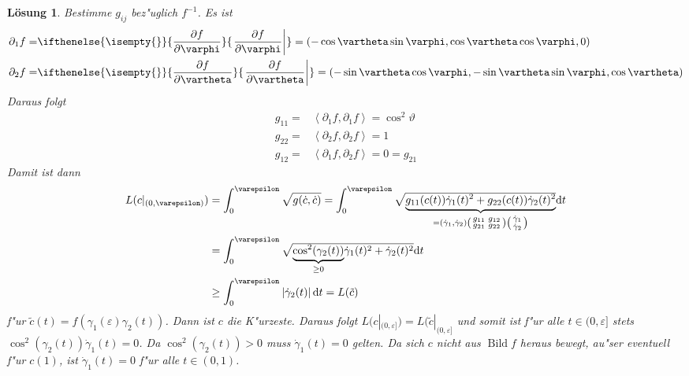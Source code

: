 \documentclass[paper=A4, twoside, chapterprefix=true, bibliography=totoc, headsepline]{scrbook}
\let\temp\phi{}
\let\phi\varphi{}
\let\varphi\temp{}
\let\temp\theta{}
\let\theta\vartheta{}
\let\vartheta\temp{}
\let\temp\epsilon{}
\let\epsilon\varepsilon{}
\let\varepsilon\temp{}
\let\temp\rho{}
\let\rho\varrho{}
\let\varrho\temp{}
\DeclareMathOperator{\Bild}{Bild}
\newcommand{\dop}{\mathrm{d}}
\newcommand{\pdifffrac}[3][]{\ifthenelse{\isempty{#1}}{\frac{\partial #2}{\partial #3}}{\left. \frac{\partial #2}{\partial #3} \right|_{#1}}}
\theoremstyle{plain}
\theoremstyle{nonumberplain}
\theoremstyle{empty}
\theoremstyle{break}
\newtheorem{Loes}{L\"osung}
\begin{document}
\begin{Loes}
Bestimme $g_{ij}$ bez"uglich $f^{-1}$. Es ist
\begin{align*}
	\partial_1 f = & \pdifffrac{f}{\phi} = \left( -\cos\theta \sin\phi, \cos\theta \cos\phi, 0 \right)\\
	\partial_2 f = & \pdifffrac{f}{\theta} = \left( -\sin\theta \cos\phi, -\sin\theta \sin\phi, \cos\theta \right)\\
\end{align*}
Daraus folgt
\begin{align*}
	g_{11} = & \left\langle \partial_1 f, \partial_1 f \right\rangle = \cos^2 \theta\\
	g_{22} = & \left\langle \partial_2 f, \partial_2 f \right\rangle = 1\\
	g_{12} = & \left\langle \partial_1 f, \partial_2 f \right\rangle = 0 = g_{21}
\end{align*}
Damit ist dann
\begin{align*}
	L(c|_{(0, \epsilon)}) &= \int_0^\epsilon \sqrt{g(\dot c, \dot c)} = \int_0^\epsilon \sqrt{\vphantom{g(\dot c, \dot c)} \smash{\underbrace{g_{11}(c(t)) \dot\gamma_1(t)^2 + g_{22}(c(t)) \dot\gamma_2(t)^2}_{= (\dot\gamma_1, \dot\gamma_2) \left(\begin{smallmatrix} g_{11} & g_{12} \\ g_{21} & g_{22} \end{smallmatrix}\right) \left(\begin{smallmatrix} \dot\gamma_1 \\ \dot\gamma_2 \end{smallmatrix}\right)}}} \dop t\\
	&= \int_0^\epsilon \sqrt{ \smash{\underbrace{\cos^2(\gamma_2(t))}_{\ge 0}} \dot\gamma_1(t)^2 + \dot\gamma_2(t)^2} \dop t \rule{0pt}{33pt}\\ %
	&\ge \int_0^\epsilon \left| \dot\gamma_2(t) \right| \dop t =L(\tilde c) \rule{0pt}{25pt}%
\end{align*}
f"ur $\tilde c(t) = f(\gamma_1(\epsilon) \gamma_2(t))$. Dann ist $c$ die K"urzeste. Daraus folgt $L(c|_{(0,\epsilon]}) = L(\tilde c|_{(0,\epsilon]}$ und somit ist f"ur alle $t \in (0,\epsilon]$ stets $\cos^2(\gamma_2(t)) \dot\gamma_1(t) = 0$. Da $\cos^2(\gamma_2(t)) > 0$ muss $\dot\gamma_1(t) = 0$ gelten. Da sich $c$ nicht aus $\Bild f$ heraus bewegt, au"ser eventuell f"ur $c(1)$, ist $\dot\gamma_1(t) = 0$ f"ur alle $t \in (0,1)$.
\end{Loes}
\end{document}
